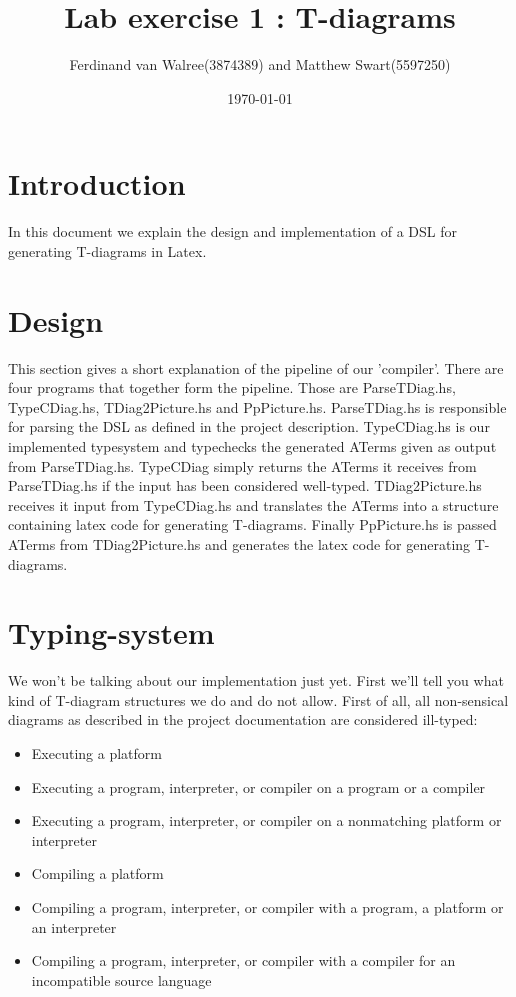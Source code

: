 \documentclass{article}
\title{Lab exercise 1 : T-diagrams}
\author {Ferdinand van Walree(3874389) and Matthew Swart(5597250)}
\date{\today}
\begin{document}
\maketitle



\section{Introduction}

In this document we explain the design and implementation of a DSL for generating T-diagrams in Latex.


\section{Design}

This section gives a short explanation of the pipeline of our 'compiler'. There are four programs that together form the pipeline. Those are ParseTDiag.hs, TypeCDiag.hs, TDiag2Picture.hs and PpPicture.hs. ParseTDiag.hs is responsible for parsing the DSL as defined in the project description. TypeCDiag.hs is our implemented typesystem and typechecks the generated ATerms given as output from ParseTDiag.hs. TypeCDiag simply returns the ATerms it receives from ParseTDiag.hs if the input has been considered well-typed. TDiag2Picture.hs receives it input from TypeCDiag.hs and translates the ATerms into a structure containing latex code for generating T-diagrams. Finally PpPicture.hs is passed ATerms from TDiag2Picture.hs and generates the latex code for generating T-diagrams.

\section{Typing-system}

We won't be talking about our implementation just yet. First we'll tell you what kind of T-diagram structures we do and do not allow.
First of all, all non-sensical diagrams as described in the project documentation are considered ill-typed:

\begin{itemize}
	\item Executing a platform
	\item Executing a program, interpreter, or compiler on a program or a compiler
	\item Executing a program, interpreter, or compiler on a nonmatching platform or interpreter
	\item Compiling a platform
	\item Compiling a program, interpreter, or compiler with a program, a platform or an interpreter
	\item Compiling a program, interpreter, or compiler with a compiler for an incompatible source language
\end{itemize}
\end{document}

